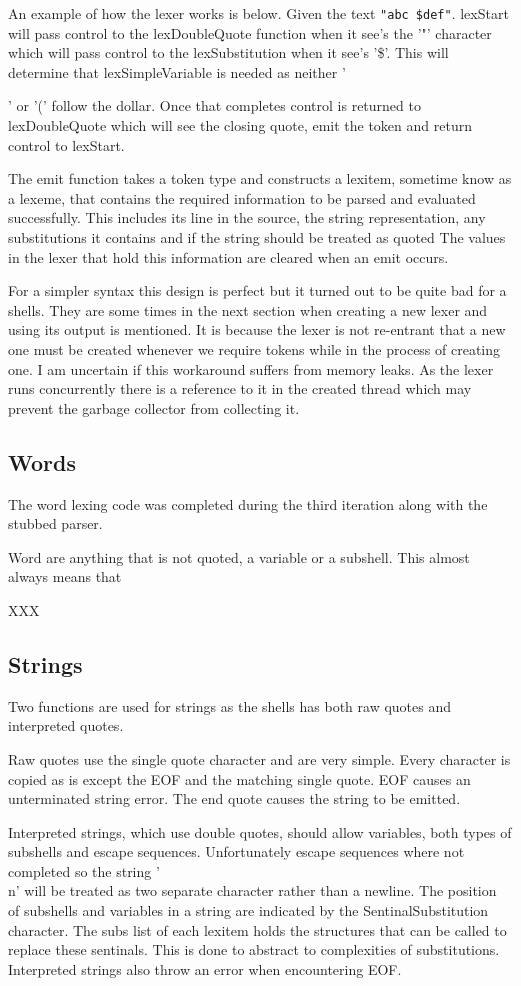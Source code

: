 An example of how the lexer works is below.
Given the text \verb!"abc $def"!.
lexStart will pass control to the lexDoubleQuote function when it see's the '"' character which will pass control to the lexSubstitution when it see's '\$'.
This will determine that lexSimpleVariable is needed as neither '{' or '(' follow the dollar.
Once that completes control is returned to lexDoubleQuote which will see the closing quote, emit the token and return control to lexStart.

The emit function takes a token type and constructs a lexitem, sometime know as a lexeme, that contains the required information to be parsed and evaluated successfully.
This includes its line in the source, the string representation, any substitutions it contains and if the string should be treated as quoted
The values in the lexer that hold this information are cleared when an emit occurs.

For a simpler syntax this design is perfect but it turned out to be quite bad for a shells.
They are some times in the next section when creating a new lexer and using its output is mentioned.
It is because the lexer is not re-entrant that a new one must be created whenever we require tokens while in the process of creating one.
I am uncertain if this workaround suffers from memory leaks.
As the lexer runs concurrently there is a reference to it in the created thread which may prevent the garbage collector from collecting it.

\subsection{Words}
The word lexing code was completed during the third iteration along with the stubbed parser.

Word are anything that is not quoted, a variable or a subshell.
This almost always means that

XXX

\subsection{Strings}
Two functions are used for strings as the shells has both raw quotes and interpreted quotes.

Raw quotes use the single quote character and are very simple.
Every character is copied as is except the EOF and the matching single quote.
EOF causes an unterminated string error.
The end quote causes the string to be emitted.

Interpreted strings, which use double quotes, should allow variables, both types of subshells and escape sequences.
Unfortunately escape sequences where not completed so the string '\\n' will be treated as two separate character rather than a newline.
The position of subshells and variables in a string are indicated by the SentinalSubstitution character.
The subs list of each lexitem holds the structures that can be called to replace these sentinals.
This is done to abstract to complexities of substitutions.
Interpreted strings also throw an error when encountering EOF.

}
